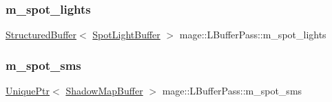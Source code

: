 \hypertarget{structmage_1_1_l_buffer_pass_af1612aa2a8d24303ebcf9e72125698f3}{}\label{structmage_1_1_l_buffer_pass_af1612aa2a8d24303ebcf9e72125698f3} 
\subsubsection{\texorpdfstring{m\+\_\+spot\+\_\+lights}{m\_spot\_lights}}
{\footnotesize\ttfamily \hyperlink{structmage_1_1_structured_buffer}{Structured\+Buffer}$<$ \hyperlink{structmage_1_1_spot_light_buffer}{Spot\+Light\+Buffer} $>$ mage\+::\+L\+Buffer\+Pass\+::m\+\_\+spot\+\_\+lights\hspace{0.3cm}{\ttfamily [private]}}

\hypertarget{structmage_1_1_l_buffer_pass_a348d64fd92b6198663494d521edcdf6b}{}\label{structmage_1_1_l_buffer_pass_a348d64fd92b6198663494d521edcdf6b} 
\subsubsection{\texorpdfstring{m\+\_\+spot\+\_\+sms}{m\_spot\_sms}}
{\footnotesize\ttfamily \hyperlink{namespacemage_a3316d7143a973e37adf1110f2e80ca31}{Unique\+Ptr}$<$ \hyperlink{structmage_1_1_shadow_map_buffer}{Shadow\+Map\+Buffer} $>$ mage\+::\+L\+Buffer\+Pass\+::m\+\_\+spot\+\_\+sms\hspace{0.3cm}{\ttfamily [private]}}

